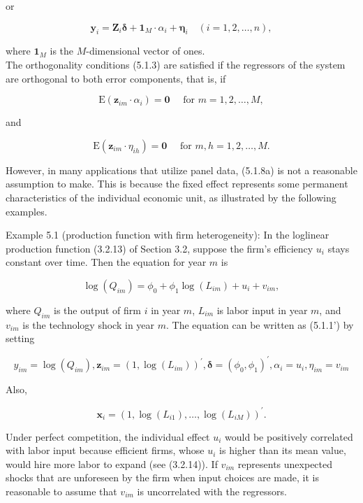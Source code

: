 \documentclass[10pt]{article}
\begin{document}
or


\begin{equation*}
\mathbf{y}_{i}=\mathbf{Z}_{i} \boldsymbol{\delta}+\mathbf{1}_{M} \cdot \alpha_{i}+\boldsymbol{\eta}_{i} \quad(i=1,2, \ldots, n), \tag{$\prime$}
\end{equation*}


where $\mathbf{1}_{M}$ is the $M$-dimensional vector of ones.\\
The orthogonality conditions (5.1.3) are satisfied if the regressors of the system are orthogonal to both error components, that is, if


\begin{equation*}
\mathrm{E}\left(\mathbf{z}_{i m} \cdot \alpha_{i}\right)=\mathbf{0} \quad \text { for } m=1,2, \ldots, M, \tag{5.1.8a}
\end{equation*}


and


\begin{equation*}
\mathrm{E}\left(\mathbf{z}_{i m} \cdot \eta_{i h}\right)=\mathbf{0} \quad \text { for } m, h=1,2, \ldots, M . \tag{5.1.8b}
\end{equation*}


However, in many applications that utilize panel data, (5.1.8a) is not a reasonable assumption to make. This is because the fixed effect represents some permanent characteristics of the individual economic unit, as illustrated by the following examples.

Example 5.1 (production function with firm heterogeneity): In the loglinear production function (3.2.13) of Section 3.2, suppose the firm's efficiency $u_{i}$ stays constant over time. Then the equation for year $m$ is

$$
\log \left(Q_{i m}\right)=\phi_{0}+\phi_{1} \log \left(L_{i m}\right)+u_{i}+v_{i m},
$$

where $Q_{i m}$ is the output of firm $i$ in year $m$, $L_{i m}$ is labor input in year $m$, and $v_{i m}$ is the technology shock in year $m$. The equation can be written as (5.1.1') by setting

$$
y_{i m}=\log \left(Q_{i m}\right), \mathbf{z}_{i m}=\left(1, \log \left(L_{i m}\right)\right)^{\prime}, \boldsymbol{\delta}=\left(\phi_{0}, \phi_{1}\right)^{\prime}, \alpha_{i}=u_{i}, \eta_{i m}=v_{i m}
$$

Also,

$$
\mathbf{x}_{i}=\left(1, \log \left(L_{i 1}\right), \ldots, \log \left(L_{i M}\right)\right)^{\prime} .
$$

Under perfect competition, the individual effect $u_{i}$ would be positively correlated with labor input because efficient firms, whose $u_{i}$ is higher than its mean value, would hire more labor to expand (see (3.2.14)). If $v_{i m}$ represents unexpected shocks that are unforeseen by the firm when input choices are made, it is reasonable to assume that $v_{i m}$ is uncorrelated with the regressors.
\end{document}
